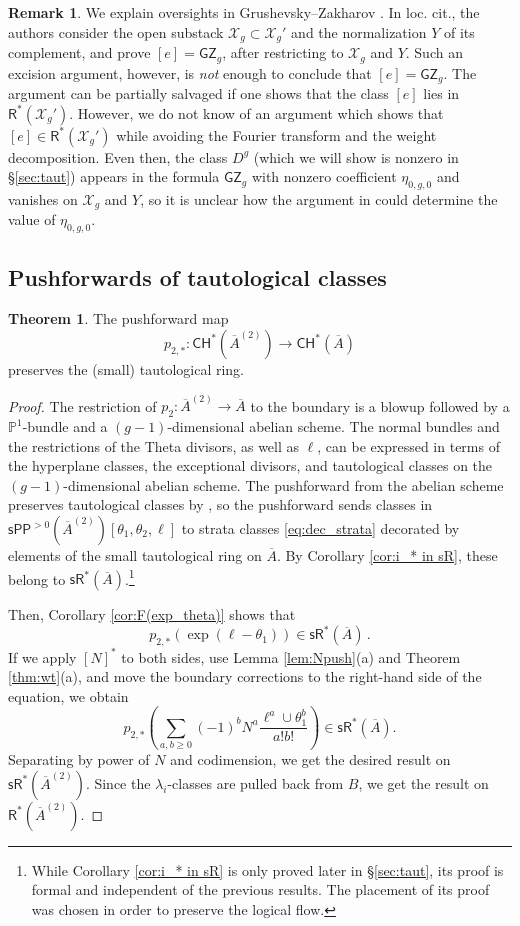 \documentclass[11pt]{article}
\def\CH{\mathsf{CH}}
\def\R{\mathsf{R}}
\def\X{\mathcal{X}}
\def\sR{\mathsf{sR}}
\newcommand{\barA}{\overline{A}}
\newcommand{\sPP}{\mathsf{sPP}}
\newcommand{\spp}{\sPP}
\theoremstyle{definition}
\newtheorem{theorem}[definition]{Theorem}
\newtheorem{remark}[definition]{Remark}
\begin{document}
\begin{remark}\label{rmk:gz}
    We explain oversights in Grushevsky--Zakharov \cite{GZ}.
    In loc. cit., the authors consider the open substack $\X_g \subset \X_g'$ and the normalization $Y$ of its complement, and prove $[e] = \mathsf{GZ}_g$, after restricting to $\X_g$ and $Y$.
    Such an excision argument, however, is {\em not} enough to conclude that $[e] = \mathsf{GZ}_g$.
    The argument can be partially salvaged if one shows that the class $[e]$ lies in $\R^*(\X_g')$. 
    However, we do not know of an argument which shows that $[e]\in \R^*(\X_g')$ while avoiding the
	Fourier transform and the weight decomposition. Even then, the class $D^g$ (which we will show is nonzero in \S\ref{sec:taut})
	appears in the formula $\mathsf{GZ}_g$ with nonzero coefficient $\eta_{0,g,0}$ and vanishes on $\mathcal X_g$ and $Y$, so it is unclear how the argument in \cite{GZ} could determine the value of $\eta_{0,g,0}$.
\end{remark}


\subsection{Pushforwards of tautological classes}

\begin{theorem}\label{thm:small}
    The pushforward map
    $$
    p_{2,*} : \CH^*(\barA^{(2)}) \to \CH^*(\barA)
    $$
    preserves the (small) tautological ring.
\end{theorem}
\begin{proof}
    The restriction of $p_2 : \barA^{(2)}\to \barA$ to the boundary is a blowup followed by a $\mathbb P^1$-bundle and a $(g-1)$-dimensional abelian scheme.
    The normal bundles and the restrictions of the Theta divisors, as well as $\ell$, can be expressed in terms of the hyperplane classes, the exceptional divisors, and tautological classes on the $(g-1)$-dimensional abelian scheme.
    The pushforward from the abelian scheme preserves tautological classes by \cite[Theorem 9.10]{BMP}, so the pushforward sends classes in $\spp^{>0}(\barA^{(2)})[\theta_1, \theta_2, \ell]$ to strata classes \eqref{eq:dec_strata} decorated by elements of the small tautological ring on $\barA$.
	By Corollary \ref{cor:i_* in sR}, these belong to $\sR^{*}(\barA)$.\footnote{While Corollary \ref{cor:i_* in sR} is only proved later in \S\ref{sec:taut}, its proof is formal and independent of the previous results. The placement of its proof was chosen in order to preserve the logical flow.}

    Then, Corollary \ref{cor:F(exp_theta)} shows that
    $$
    p_{2,*}(\exp(\ell -\theta_1)) \in \sR^*(\barA)\,.
    $$
    If we apply $[N]^*$ to both sides, use Lemma \ref{lem:Npush}(a) and Theorem \ref{thm:wt}(a), and move the boundary corrections to the right-hand side of the equation, we obtain
    $$
    p_{2,*}\left(\sum_{a, b\geq 0}(-1)^bN^a\frac{\ell^a\cup\theta_1^b}{a!b!}\right) \in \sR^*(\barA).
    $$
    Separating by power of $N$ and codimension, we get the desired result on $\sR^*(\barA^{(2)})$. Since the $\lambda_i$-classes are pulled back from $B$, we get the result on $\R^*(\barA^{(2)})$.
\end{proof}
\end{document}
